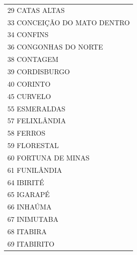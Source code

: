 \documentclass{article}
\begin{document}
\begin{longtable}[c]{m{18cm}}
\multicolumn{1}{l}{ \hspace{2em} 29 CATAS ALTAS } \\
\multicolumn{1}{l}{ \hspace{2em} 33 CONCEIÇÃO DO MATO DENTRO } \\
\multicolumn{1}{l}{ \hspace{2em} 34 CONFINS } \\
\multicolumn{1}{l}{ \hspace{2em} 36 CONGONHAS DO NORTE } \\
\multicolumn{1}{l}{ \hspace{2em} 38 CONTAGEM } \\
\multicolumn{1}{l}{ \hspace{2em} 39 CORDISBURGO } \\
\multicolumn{1}{l}{ \hspace{2em} 40 CORINTO } \\
\multicolumn{1}{l}{ \hspace{2em} 45 CURVELO } \\
\multicolumn{1}{l}{ \hspace{2em} 55 ESMERALDAS } \\
\multicolumn{1}{l}{ \hspace{2em} 57 FELIXLÂNDIA } \\
\multicolumn{1}{l}{ \hspace{2em} 58 FERROS } \\
\multicolumn{1}{l}{ \hspace{2em} 59 FLORESTAL } \\
\multicolumn{1}{l}{ \hspace{2em} 60 FORTUNA DE MINAS } \\
\multicolumn{1}{l}{ \hspace{2em} 61 FUNILÂNDIA } \\
\multicolumn{1}{l}{ \hspace{2em} 64 IBIRITÉ } \\
\multicolumn{1}{l}{ \hspace{2em} 65 IGARAPÉ } \\
\multicolumn{1}{l}{ \hspace{2em} 66 INHAÚMA } \\
\multicolumn{1}{l}{ \hspace{2em} 67 INIMUTABA } \\
\multicolumn{1}{l}{ \hspace{2em} 68 ITABIRA } \\
\multicolumn{1}{l}{ \hspace{2em} 69 ITABIRITO } \\

\end{longtable}
\end{document}
